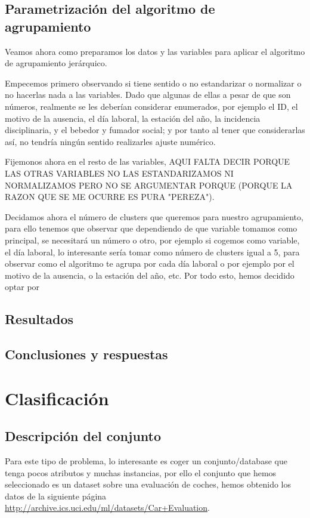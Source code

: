 \documentclass[a4paper, 11pt, twoside, openany, onecolumn, final]{memoir}
\begin{document}
	\section{Parametrización del algoritmo de agrupamiento}
	Veamos ahora como preparamos los datos y las variables para aplicar el algoritmo de agrupamiento jerárquico.
	
	Empecemos primero observando si tiene sentido o no estandarizar o normalizar o no hacerlas nada a las variables. Dado que algunas de ellas a pesar de que son números, realmente se les deberían considerar enumerados, por ejemplo el ID, el motivo de la ausencia, el día laboral, la estación del año, la incidencia disciplinaria, y el bebedor y fumador social; y por tanto al tener que considerarlas así, no tendría ningún sentido realizarles ajuste numérico.
	
	Fijemonos ahora en el resto de las variables,   AQUI FALTA DECIR PORQUE LAS OTRAS VARIABLES NO LAS ESTANDARIZAMOS NI NORMALIZAMOS PERO NO SE ARGUMENTAR PORQUE (PORQUE LA RAZON QUE SE ME OCURRE ES PURA "PEREZA").
	
	Decidamos ahora el número de clusters que queremos para nuestro agrupamiento, para ello tenemos que observar que dependiendo de que variable tomamos como principal, se necesitará un número o otro, por ejemplo si cogemos como variable, el día laboral, lo interesante sería tomar como número de clusters igual a 5, para observar como el algoritmo te agrupa por cada día laboral o por ejemplo por el motivo de la ausencia, o la estación del año, etc.
	Por todo esto, hemos decidido optar por 
	\section{Resultados}
	\section{Conclusiones y respuestas}
	\chapter{Clasificación}
		\section{Descripción del conjunto}
		Para este tipo de problema, lo interesante es coger un conjunto/database que tenga pocos atributos y muchas instancias, por ello el conjunto que hemos seleccionado es un dataset sobre una evaluación de coches, hemos obtenido los datos de la siguiente página \url{http://archive.ics.uci.edu/ml/datasets/Car+Evaluation}.
		
\end{document}
